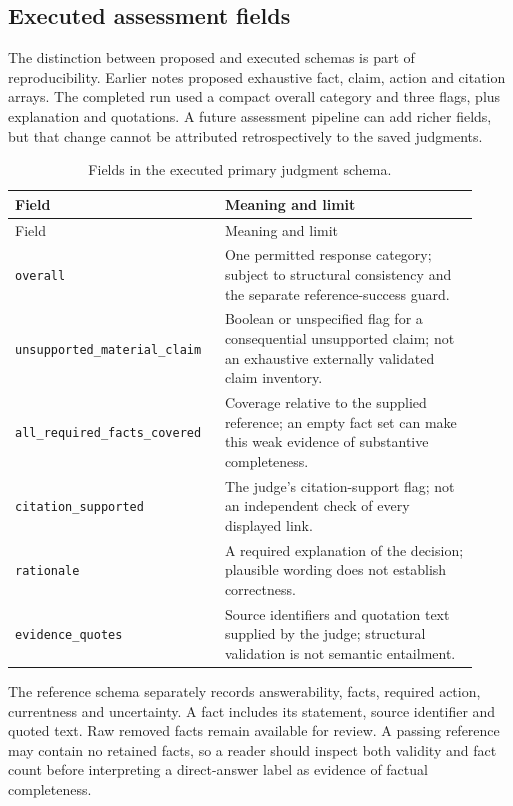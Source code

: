 \subsection{Executed assessment fields}

The distinction between proposed and executed schemas is part of reproducibility. Earlier notes proposed exhaustive fact, claim, action and citation arrays. The completed run used a compact overall category and three flags, plus explanation and quotations. A future assessment pipeline can add richer fields, but that change cannot be attributed retrospectively to the saved judgments.

\begin{longtable}{@{}p{0.40\linewidth}p{0.52\linewidth}@{}}
\caption{Fields in the executed primary judgment schema.}\label{tab:judgment-fields}\\
\toprule
Field & Meaning and limit \\
\midrule
\endfirsthead
\toprule
Field & Meaning and limit \\
\midrule
\endhead
\texttt{overall} & One permitted response category; subject to structural consistency and the separate reference-success guard. \\
\texttt{unsupported\_material\_claim} & Boolean or unspecified flag for a consequential unsupported claim; not an exhaustive externally validated claim inventory. \\
\texttt{all\_required\_facts\_covered} & Coverage relative to the supplied reference; an empty fact set can make this weak evidence of substantive completeness. \\
\texttt{citation\_supported} & The judge's citation-support flag; not an independent check of every displayed link. \\
\texttt{rationale} & A required explanation of the decision; plausible wording does not establish correctness. \\
\texttt{evidence\_quotes} & Source identifiers and quotation text supplied by the judge; structural validation is not semantic entailment. \\
\bottomrule
\end{longtable}

The reference schema separately records answerability, facts, required action, currentness and uncertainty. A fact includes its statement, source identifier and quoted text. Raw removed facts remain available for review. A passing reference may contain no retained facts, so a reader should inspect both validity and fact count before interpreting a direct-answer label as evidence of factual completeness.

